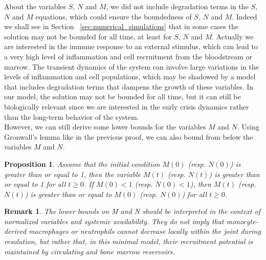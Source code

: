 \documentclass[a4paper, 12pt]{article}
\newtheorem{rem}{Remark}[section]
\newtheorem{proposition}{Proposition}[section]
\providecommand{\DIFaddtex}[1]{{\protect\color{blue} \sf #1}} %
\providecommand{\DIFaddbegin}{} %
\providecommand{\DIFaddend}{} %
\providecommand{\DIFadd}[1]{\texorpdfstring{\DIFaddtex{#1}}{#1}} %
\begin{document}
About the variables $S$, $N$ and $M$, we did not  include degradation terms in the $S$, $N$ and  $M$ equations, which could ensure the boundedness of $S$, $N$ and $M$.
    Indeed we shall see in Section\DIFaddbegin \DIFadd{~}\DIFaddend \ref{sec:numerical_simulations} that in some cases the solution may not be bounded for all time, at least for $S$, $N$ and $M$.
     Actually we are interested in the  immune response to an external stimulus, which can lead to a very high level of inflammation and cell recruitment from the bloodstream or marrow. 
     The transient dynamics of the system can involve large variations in the levels of inflammation and cell populations, which may be shadowed by a model that includes degradation terms that dampens the growth of these variables.
    In our model, the solution may not be bounded for all time,
     but it can still be biologically relevant since we are interested in the early crisis dynamics 
     rather than the long-term behavior of the system.\\
However, we can still derive some lower bounds for the variables $M$ and $N$.    
Using Gronwall's lemma like in the previous proof, we can also bound from below the variables $M$ and  $N$.
\begin{proposition}
Assume that the initial condition $M(0)$ (resp. $N(0)$) is greater than or equal to 1, then
the variable $M(t)$ (resp. $N(t)$) is greater than or equal to 1 for all $t \geq 0$. If $M(0) < 1$ (resp. $N(0) < 1$), then $M(t)$ (resp. $N(t)$) is greater than or equal to $M(0)$ (resp. $N(0)$) for all $t \geq 0$.    
\end{proposition}
\begin{rem}
The lower bounds on M and N should be interpreted in the context of normalized variables and systemic availability.
 They do not imply that monocyte-derived macrophages or neutrophils cannot decrease locally within the joint during resolution, but rather that, in this minimal model,
  their recruitment potential is maintained by circulating and bone marrow reservoirs.

\end{rem}
\end{document}
